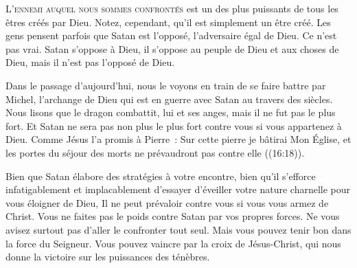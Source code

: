 

\lettrine{L}{'ennemi auquel nous sommes confrontés} est un des plus puissants
 de tous les êtres créés par Dieu. Notez, cependant, qu'il est simplement
 un être créé. Les gens pensent parfois que Satan est l'opposé,
 l'adversaire égal de Dieu. Ce n'est pas vrai. Satan s'oppose à Dieu,
 il s'oppose au peuple de Dieu et aux choses de Dieu,
 mais il n'est pas l'opposé de Dieu.


Dans le passage d'aujourd'hui, nous le voyons en train de se faire battre
 par Michel, l'archange de Dieu qui est en guerre avec Satan
 au travers des siècles. Nous lisons que 
 \og le dragon combattit, lui et ses anges,
 mais il ne fut pas le plus fort. \fg{}
 Et Satan ne sera pas non plus le plus fort contre vous
 si vous appartenez à Dieu. Comme Jésus l'a promis à Pierre~: 
 \og Sur cette pierre je bâtirai Mon Église, et les portes du séjour
 des morts ne prévaudront pas contre elle \fg{} ((16:18)).

Bien que Satan élabore des stratégies à votre encontre,
 bien qu'il s'efforce infatigablement et implacablement d'essayer d'éveiller
 votre nature charnelle pour vous éloigner de Dieu, Il ne peut prévaloir
 contre vous si vous vous armez de Christ.
 Vous ne faites pas le poids contre Satan par vos propres forces.
 Ne vous avisez surtout pas d'aller le confronter tout seul.
 Mais vous pouvez tenir bon dans la force du Seigneur.
 Vous pouvez vaincre par la croix de Jésus-Christ,
 qui nous donne la victoire sur les puissances des ténèbres.

\dvrule






